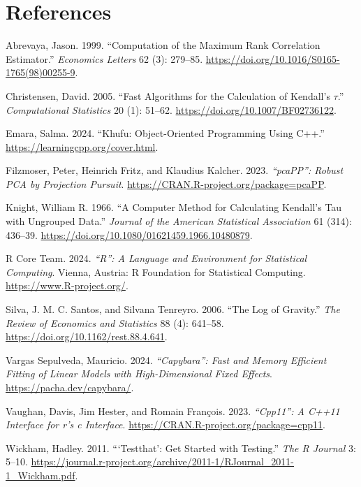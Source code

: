 \documentclass[12pt]{article}
\newlength{\cslhangindent}
\newenvironment{CSLReferences}[2] %
 {\begin{list}{}{%
  \setlength{\itemindent}{0pt}
  \setlength{\leftmargin}{0pt}
  \setlength{\parsep}{0pt}
  \ifodd #1
   \setlength{\leftmargin}{\cslhangindent}
   \setlength{\itemindent}{-1\cslhangindent}
  \fi
  \setlength{\itemsep}{#2\baselineskip}}}
 {\end{list}}
\begin{document}
\section*{References}\label{references}

\label{refs}
\begin{CSLReferences}{1}{0}
Abrevaya, Jason. 1999. {``Computation of the Maximum Rank Correlation
Estimator.''} \emph{Economics Letters} 62 (3): 279--85.
\url{https://doi.org/10.1016/S0165-1765(98)00255-9}.

Christensen, David. 2005. {``Fast Algorithms for the Calculation of
{Kendall}'s \(\tau\).''} \emph{Computational Statistics} 20 (1): 51--62.
\url{https://doi.org/10.1007/BF02736122}.

Emara, Salma. 2024. {``Khufu: {Object}-{Oriented} {Programming} Using
{C}++.''} \url{https://learningcpp.org/cover.html}.

Filzmoser, Peter, Heinrich Fritz, and Klaudius Kalcher. 2023.
\emph{{``pcaPP''}: Robust PCA by Projection Pursuit}.
\url{https://CRAN.R-project.org/package=pcaPP}.

Knight, William R. 1966. {``A {Computer} {Method} for {Calculating}
{Kendall}'s {Tau} with {Ungrouped} {Data}.''} \emph{Journal of the
American Statistical Association} 61 (314): 436--39.
\url{https://doi.org/10.1080/01621459.1966.10480879}.

R Core Team. 2024. \emph{{``R''}: A Language and Environment for
Statistical Computing}. Vienna, Austria: {R} Foundation for Statistical
Computing. \url{https://www.R-project.org/}.

Silva, J. M. C. Santos, and Silvana Tenreyro. 2006. {``The Log of
Gravity.''} \emph{The Review of Economics and Statistics} 88 (4):
641--58. \url{https://doi.org/10.1162/rest.88.4.641}.

Vargas Sepulveda, Mauricio. 2024. \emph{{``Capybara''}: Fast and Memory
Efficient Fitting of Linear Models with High-Dimensional Fixed Effects}.
\url{https://pacha.dev/capybara/}.

Vaughan, Davis, Jim Hester, and Romain François. 2023.
\emph{{``Cpp11''}: A {C++}11 Interface for r's c Interface}.
\url{https://CRAN.R-project.org/package=cpp11}.

Wickham, Hadley. 2011. {``{`Testthat'}: Get Started with Testing.''}
\emph{The R Journal} 3: 5--10.
\url{https://journal.r-project.org/archive/2011-1/RJournal_2011-1_Wickham.pdf}.

\end{CSLReferences}

\end{document}
